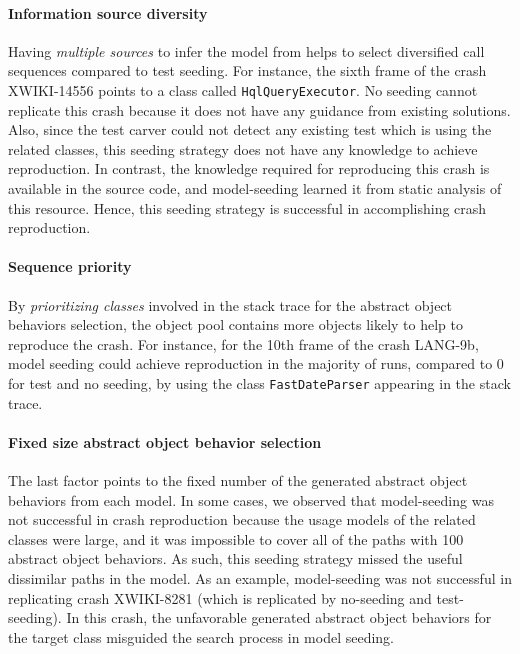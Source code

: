 \paragraph{Information source diversity}
Having \emph{multiple sources} to infer the model from helps to select diversified call sequences compared to test seeding. For instance, the sixth frame of the crash XWIKI-14556 points to a class called \texttt{HqlQueryExecutor}. No seeding cannot replicate this crash because it does not have any guidance from existing solutions. Also, since the test carver could not detect any existing test which is using the related classes, this seeding strategy does not have any knowledge to achieve reproduction. In contrast, the knowledge required for reproducing this crash is available in the source code, and model-seeding learned it from static analysis of this resource. Hence, this seeding strategy is successful in accomplishing crash reproduction.

\paragraph{Sequence priority}
By \emph{prioritizing classes} involved in the stack trace for the abstract object behaviors selection, the object pool contains more objects likely to help to reproduce the crash. For instance, for the 10th frame of the crash LANG-9b, model seeding could achieve reproduction in the majority of runs, compared to 0 for test and no seeding, by using the class \texttt{Fast\-Date\-Parser} appearing in the stack trace.

\paragraph{Fixed size abstract object behavior selection}
The last factor points to the fixed number of the generated abstract object behaviors from each model. In some cases, we observed that model-seeding was not successful in crash reproduction because the usage models of the related classes were large, and it was impossible to cover all of the paths with 100 abstract object behaviors. As such, this seeding strategy missed the useful dissimilar paths in the model. As an example, model-seeding was not successful in replicating crash XWIKI-8281 (which is replicated by no-seeding and test-seeding). In this crash, the unfavorable generated abstract object behaviors for the target class misguided the search process in model seeding.


